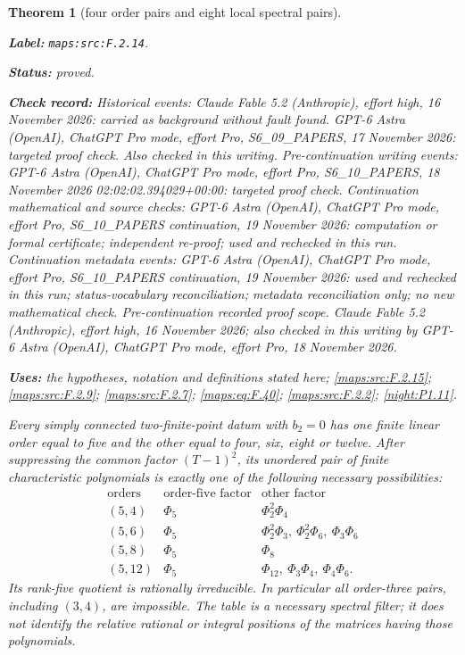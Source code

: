 \documentclass[11pt,a4paper]{article}
\newtheorem{theorem}{Theorem}[section]
\theoremstyle{definition}
\newcommand{\StatementRecord}[4]{\par\smallskip\begingroup\upshape\raggedright\noindent\textbf{Label:} \nolinkurl{#1}.\par\noindent\textbf{Status:} #2.\par\noindent\textbf{Check record:} #3.\par\noindent\textbf{Uses:} #4.\par\endgroup\smallskip}
\begin{document}
\begin{theorem}[four order pairs and eight local spectral pairs]\label{maps:src:F.2.14}
\StatementRecord{maps:src:F.2.14}{proved}{Historical events: Claude Fable 5.2 (Anthropic), effort high, 16 November 2026: carried as background without fault found. GPT-6 Astra (OpenAI), ChatGPT Pro mode, effort Pro, S6\_09\_PAPERS, 17 November 2026: targeted proof check. Also checked in this writing. Pre-continuation writing events: GPT-6 Astra (OpenAI), ChatGPT Pro mode, effort Pro, S6\_10\_PAPERS, 18 November 2026 02:02:02.394029+00:00: targeted proof check. Continuation mathematical and source checks: GPT-6 Astra (OpenAI), ChatGPT Pro mode, effort Pro, S6\_10\_PAPERS continuation, 19 November 2026: computation or formal certificate; independent re-proof; used and rechecked in this run. Continuation metadata events: GPT-6 Astra (OpenAI), ChatGPT Pro mode, effort Pro, S6\_10\_PAPERS continuation, 19 November 2026: used and rechecked in this run; status-vocabulary reconciliation; metadata reconciliation only; no new mathematical check. \emph{Pre-continuation recorded proof scope.} Claude Fable 5.2 (Anthropic), effort high, 16 November 2026; also checked in this writing by GPT-6 Astra (OpenAI), ChatGPT Pro mode, effort Pro, 18 November 2026}{the hypotheses, notation and definitions stated here; \cref{maps:src:F.2.15}; \cref{maps:src:F.2.9}; \cref{maps:src:F.2.7}; \cref{maps:eq:F.40}; \cref{maps:src:F.2.2}; \cref{night:P1.11}}


Every simply connected two-finite-point datum with $b_2=0$ has
one finite linear order equal to five and the other equal
to four, six, eight or twelve.
After suppressing the common factor $(T-1)^2$, its unordered
pair of finite characteristic polynomials is exactly one
of the following necessary possibilities:
\[
\begin{array}{c|c|l}
 \text{orders}&\text{order-five factor}&\text{other factor}\\\hline
 (5,4)&\Phi_5&\Phi_2^2\Phi_4\\
 (5,6)&\Phi_5&\Phi_2^2\Phi_3,\ \Phi_2^2\Phi_6,\ \Phi_3\Phi_6\\
 (5,8)&\Phi_5&\Phi_8\\
 (5,12)&\Phi_5&\Phi_{12},\ \Phi_3\Phi_4,\ \Phi_4\Phi_6.
\end{array}
 \tag{F.39}\label{maps:eq:F.39}
\]
Its rank-five quotient is rationally irreducible.
In particular all order-three pairs, including $(3,4)$,
are impossible.  The table is a necessary spectral filter;
it does not identify the relative rational or integral
positions of the matrices having those polynomials.

\end{theorem}
\end{document}
